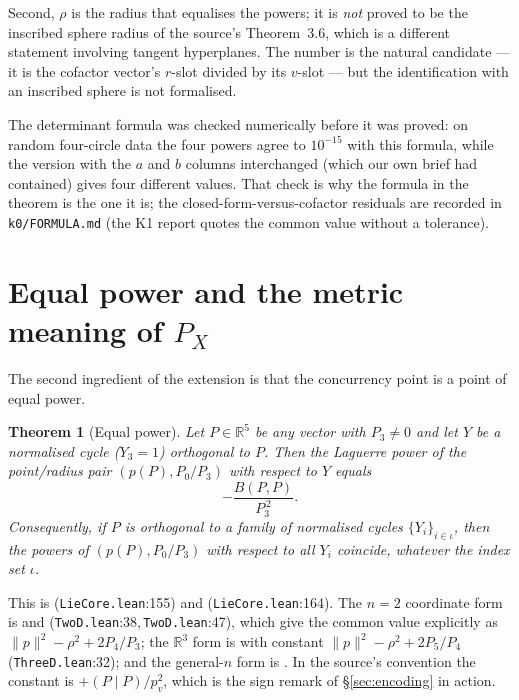 \documentclass[11pt]{article}
\newtheorem{theorem}{Theorem}
\theoremstyle{definition}
\theoremstyle{remark}
\newcommand{\src}[3]{\texttt{#2}:#3}
\newcommand{\RR}{\mathbb{R}}
\begin{document}
Second, $\rho$ is the radius that equalises the powers; it is \emph{not} proved to be the inscribed
sphere radius of the source's Theorem~3.6, which is a different statement involving tangent
hyperplanes. The number is the natural candidate --- it is the cofactor vector's $r$-slot divided by its
$v$-slot --- but the identification with an inscribed sphere is not formalised.

The determinant formula was checked numerically before it was proved: on random four-circle data the
four powers agree to $10^{-15}$ with this formula, while the version with the $a$ and $b$ columns
interchanged (which our own brief had contained) gives four different values. That check is why the
formula in the theorem is the one it is; the closed-form-versus-cofactor residuals are recorded in
\texttt{k0/FORMULA.md} (the K1 report quotes the common value without a tolerance).

\section{Equal power and the metric meaning of \texorpdfstring{$P_X$}{P\_X}}\label{sec:equalpower}

The second ingredient of the extension is that the concurrency point is a point of equal power.

\begin{theorem}[Equal power]\label{thm:equalpower}
Let $P\in\RR^5$ be any vector with $P_3\neq0$ and let $Y$ be a normalised cycle ($Y_3=1$)
orthogonal to $P$.
Then the Laguerre power of the point/radius pair $(p(P),P_0/P_3)$ with respect to $Y$ equals
\[
-\frac{B(P,P)}{P_3^{\,2}} .
\]
Consequently, if $P$ is orthogonal to a family of normalised cycles $\{Y_i\}_{i\in\iota}$, then the
powers of $(p(P),P_0/P_3)$ with respect to all $Y_i$ coincide, whatever the index set $\iota$.
\end{theorem}

This is  (\src{PaperK}{LieCore.lean}{155}) and
 (\src{PaperK}{LieCore.lean}{164}). The $n=2$ coordinate form is
 and 
(\src{PaperK}{TwoD.lean}{38},\,\src{PaperK}{TwoD.lean}{47}), which give the common value explicitly as
$\lVert p\rVert^2-\rho^2+2P_4/P_3$; the $\RR^3$ form is  with constant
$\lVert p\rVert^2-\rho^2+2P_5/P_4$ (\src{PaperK}{ThreeD.lean}{32}); and the general-$n$ form is
. In the source's convention the constant is
$+(P\mid P)/p_v^2$, which is the sign remark of \S\ref{sec:encoding} in action.
\end{document}
